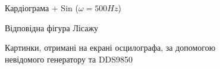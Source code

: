 \begin{figure}[h]
\begin{minipage}[h]{0.47\linewidth}
	\end{minipage}
	\vfill
	\begin{minipage}[h]{0.47\linewidth}
		 Кардіограма + Sin ($\omega = 500Hz$) \\
	\end{minipage}
	\hfill
	\begin{minipage}[h]{0.47\linewidth}
		 Відповідна фігура Лісажу \\
	\end{minipage}
	\caption{Картинки, отримані на екрані осцилографа, за допомогою невідомого генератору та DDS9850}
	\label{fig:part2}
\end{figure}


